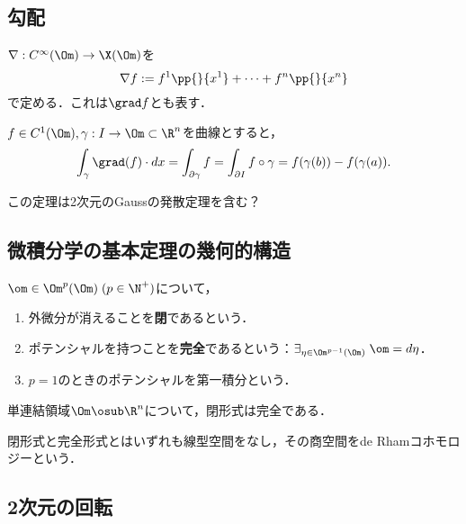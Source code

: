 \documentclass[uplatex,dvipdfmx]{jsreport}
\begin{document}
\subsection{勾配}

\begin{definition}[勾配]
    $\nabla:C^\infty(\Om)\to\X(\Om)$を
    \[\nabla f:=f^1\pp{}{x^1}+\cdots+f^n\pp{}{x^n}\]
    で定める．これは$\grad f$とも表す．
\end{definition}

\begin{theorem}
    $f\in C^1(\Om),\gamma:I\to\Om\subset\R^n$を曲線とすると，
    \[\int_\gamma\grad(f)\cdot dx=\int_{\partial\gamma}f=\int_{\partial I}f\circ\gamma=f(\gamma(b))-f(\gamma(a)).\]
\end{theorem}
\begin{remarks}
    この定理は2次元のGaussの発散定理を含む？
\end{remarks}

\subsection{微積分学の基本定理の幾何的構造}

\begin{definition}
    $\om\in\Om^p(\Om)\;(p\in\N^+)$について，
    \begin{enumerate}
        \item 外微分が消えることを\textbf{閉}であるという．
        \item ポテンシャルを持つことを\textbf{完全}であるという：$\exists_{\eta\in\Om^{p-1}(\Om)}\;\om=d\eta$．
        \item $p=1$のときのポテンシャルを第一積分という．
    \end{enumerate}
\end{definition}

\begin{theorem}[Poincaré]
    単連結領域$\Om\osub\R^n$について，閉形式は完全である．
\end{theorem}
\begin{remarks}
    閉形式と完全形式とはいずれも線型空間をなし，その商空間をde Rhamコホモロジーという．
\end{remarks}



\subsection{2次元の回転}
\end{document}

